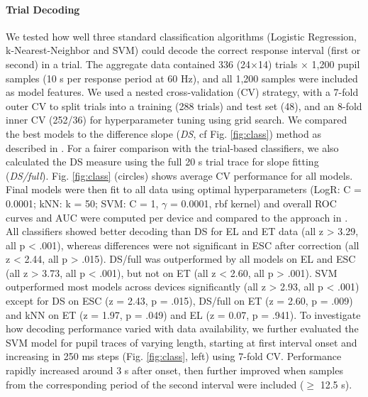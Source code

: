 \documentclass[manuscript]{acmart}
\begin{document}
\paragraph{Trial Decoding} We tested how well three standard classification algorithms (Logistic Regression, k-Nearest-Neighbor and SVM) could decode the correct response interval (first or second) in a trial. The aggregate data contained 336 (24$\times$14) trials $\times$ 1,200 pupil samples (10 s per response period at 60 Hz), and all 1,200 samples were included as model features. We used a nested cross-validation (CV) strategy, with a 7-fold outer CV to split trials into a training (288 trials) and test set (48), and an 8-fold inner CV (252/36) for hyperparameter tuning using grid search. We compared the best models to the difference slope (\textit{DS}, cf Fig. \ref{fig:class}) method as described in \cite{Stoll2013}. For a fairer comparison with the trial-based classifiers, we also calculated the DS measure using the full 20 s trial trace for slope fitting (\textit{DS/full}). Fig. \ref{fig:class} (circles) shows average CV performance for all models. Final models were then fit to all data using optimal hyperparameters (LogR: C = 0.0001; kNN: k = 50; SVM: C = 1, $\gamma$ = 0.0001, rbf kernel) and overall ROC curves and AUC were computed per device and compared to the approach in \cite{Stoll2013}. All classifiers showed better decoding than DS for EL and ET data (all z > 3.29, all p < .001), whereas differences were not significant in ESC after correction (all z < 2.44, all p > .015). DS/full was outperformed by all models on EL and ESC (all z > 3.73, all p < .001), but not on ET (all z < 2.60, all p > .001). SVM outperformed most models across devices significantly (all z > 2.93, all p < .001) except for DS on ESC (z = 2.43, p = .015), DS/full on ET (z = 2.60, p = .009) and kNN on ET (z = 1.97, p = .049) and EL (z = 0.07, p = .941). To investigate how decoding performance varied with data availability, we further evaluated the SVM model for pupil traces of varying length, starting at first interval onset and increasing in 250 ms steps (Fig. \ref{fig:class}, left) using 7-fold CV. Performance rapidly increased around 3 s after onset, then further improved when samples from the corresponding period of the second interval were included ($\geq$ 12.5 s). 
\end{document}
